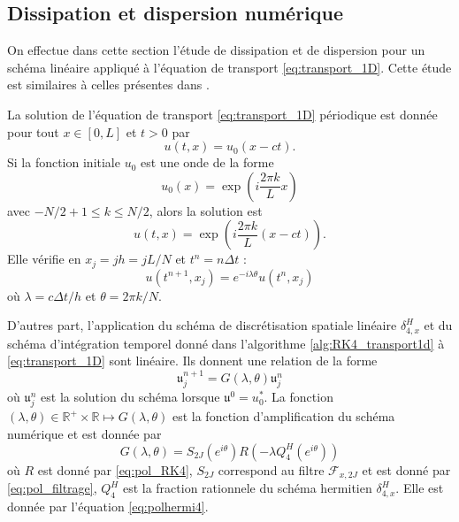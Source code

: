 \subsection{Dissipation et dispersion numérique}

On effectue dans cette section l'étude de dissipation et de dispersion pour un schéma linéaire appliqué à l'équation de transport \eqref{eq:transport_1D}. Cette étude est similaires à celles présentes dans \cite{Desquesnes2007, Dubois2016}.

La solution de l'équation de transport \eqref{eq:transport_1D} périodique est donnée pour tout $x \in [0,L]$ et $t>0$ par
\begin{equation}
u(t,x)=u_0(x-ct).
\end{equation}
Si la fonction initiale $u_0$ est une onde de la forme 
\begin{equation}
u_0(x) = \exp \left( i \dfrac{2 \pi k}{L} x \right)
\end{equation}
avec $-N/2 +1 \leq k \leq N/2 $, alors la solution est
\begin{equation}
u(t,x) = \exp \left( i \dfrac{2 \pi k}{L} (x-ct) \right).
\end{equation}
Elle vérifie en $x_j = j h = j L/N$ et $t^n = n \Delta t$ :
\begin{equation}
u(t^{n+1},x_j) = e^{-i \lambda \theta} u(t^n,x_j)
\label{eq:e(ilambdateta)}
\end{equation}
où $\lambda = c \Delta t /h$ et $\theta = 2 \pi k / N$.

D'autres part, l'application du schéma de discrétisation spatiale linéaire $\delta_{4,x}^H$ et du schéma d'intégration temporel donné dans l'algorithme \ref{alg:RK4_transport1d} à \eqref{eq:transport_1D} sont linéaire. Ils donnent une relation de la forme
\begin{equation}
\mathfrak{u}_j^{n+1} = G(\lambda, \theta) \mathfrak{u}_j^n
\end{equation}
où $\mathfrak{u}_j^n$ est la solution du schéma lorsque $\mathfrak{u}^0 = u_0^*$. La fonction $(\lambda, \theta) \in \mathbb{R}^+ \times \mathbb{R} \mapsto G(\lambda,\theta)$ est la fonction d'amplification du schéma numérique et est donnée par
\begin{equation}
G(\lambda, \theta) = S_{2J}(e^{i \theta}) R(- \lambda Q^H_{4}(e^{i \theta}) )
\end{equation}
où $R$ est donné par \eqref{eq:pol_RK4}, $S_{2J}$ correspond au filtre $\mathcal{F}_{x,2J}$ et est donné par \eqref{eq:pol_filtrage}, $Q_4^H$ est la fraction rationnele du schéma hermitien $\delta_{4,x}^H$. Elle est donnée par l'équation \eqref{eq:polhermi4}.

